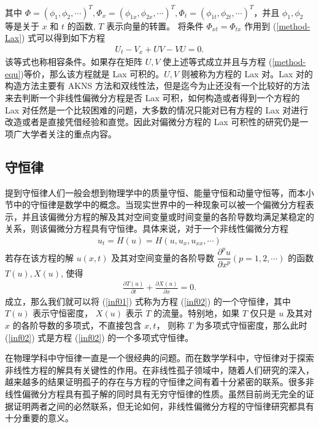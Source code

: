 其中 $\Phi=(\phi_1, \phi_2, \cdots)^T, \Phi_x=(\phi_{1x}, \phi_{2x}, \cdots)^T, \Phi_t=(\phi_{1t}, \phi_{2t}, \cdots)^T$，并且 $\phi_1, \phi_2$ 等是关于 $x$ 和 $t$ 的函数, $T$ 表示向量的转置。 将条件 $\Phi_{xt}=\Phi_{tx}$ 作用到 (\ref{method-Lax}) 式可以得到如下方程
\begin{align}
U_t-V_x+UV-VU=0.
\end{align}
该等式也称相容条件。如果存在矩阵 $U, V$ 使上述等式成立并且与方程 (\ref{method-equ})等价，那么该方程就是  Lax 可积的。$U, V$ 则被称为方程的 Lax 对。Lax 对的构造方法主要有  AKNS 方法和双线性法，但是迄今为止还没有一个比较好的方法来去判断一个非线性偏微分方程是否 Lax 可积，如何构造或者得到一个方程的 Lax 对任然是一个比较困难的问题，大多数的情况只能对已有方程的 Lax 对进行改造或者是直接凭借经验和直觉。因此对偏微分方程的 Lax 可积性的研究仍是一项广大学者关注的重点内容。

\subsection{守恒律}
提到守恒律人们一般会想到物理学中的质量守恒、能量守恒和动量守恒等，而本小节中的守恒律是数学中的概念。当现实世界中的一种现象可以被一个偏微分方程表示，并且该偏微分方程的解及其对空间变量或时间变量的各阶导数均满足某稳定的关系，则该偏微分方程具有守恒律。具体来说，对于一个非线性偏微分方程
\begin{align}
u_t = H(u) =  H(u, u_x, u_{xx}, \cdots)\label{inf02}
\end{align}
若存在该方程的解  $u(x, t)$ 及其对空间变量的各阶导数 $\dfrac{\partial^pu}{\partial x^p}(p=1,2,\cdots)$ 的函数 $T(u), X(u)$, 使得
\begin{align}
\frac{\partial T(u)}{\partial t}+\frac{\partial X(u)}{\partial x}=0. \label{inf01}
\end{align}
成立，那么我们就可以将 (\ref{inf01}) 式称为方程 (\ref{inf02}) 的一个守恒律，其中 $T(u)$ 表示守恒密度， $X(u)$ 表示 $T$ 的流量。特别地，如果 $T$ 仅只是 $u$ 及其对 $x$ 的各阶导数的多项式，不直接包含 $x, t$， 则称 $T$ 为多项式守恒密度，那么此时 (\ref{inf02}) 式是方程 (\ref{inf02}) 的一个多项式守恒律。

在物理学科中守恒律一直是一个很经典的问题。而在数学学科中，守恒律对于探索非线性方程的解具有关键性的作用。在非线性孤子领域中，随着人们研究的深入，越来越多的结果证明孤子的存在与方程的守恒律之间有着十分紧密的联系。很多非线性偏微分方程具有孤子解的同时具有无穷守恒律的性质。虽然目前尚无完全的证据证明两者之间的必然联系，但无论如何，非线性偏微分方程的守恒律研究都具有十分重要的意义。


